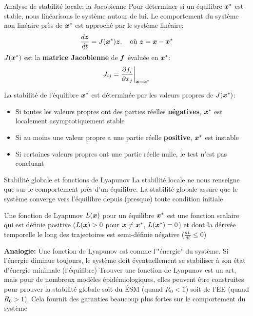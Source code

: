 \documentclass[aspectratio=169]{beamer}\usepackage[]{graphicx}\usepackage[]{xcolor}
\begin{document}
\begin{frame}{Analyse de stabilité locale: la Jacobienne}
    Pour déterminer si un équilibre $\bm{x}^*$ est stable, nous linéarisons le système autour de lui.
    Le comportement du système non linéaire près de $\bm{x}^*$ est approché par le système linéaire:
    $$ \frac{d\bm{z}}{dt} = J(\bm{x}^*) \bm{z}, \quad \text{où } \bm{z} = \bm{x} - \bm{x}^* $$
    $J(\bm{x}^*)$ est la \textbf{matrice Jacobienne} de $\bm{f}$ évaluée en $\bm{x}^*$:
    $$ J_{ij} = \frac{\partial f_i}{\partial x_j} \bigg|_{\bm{x}=\bm{x}^*} $$
    \begin{theorem}
        La stabilité de l'équilibre $\bm{x}^*$ est déterminée par les valeurs propres de $J(\bm{x}^*)$:
        \begin{itemize}
            \item Si toutes les valeurs propres ont des parties réelles \textbf{négatives}, $\bm{x}^*$ est localement asymptotiquement stable
            \item Si au moins une valeur propre a une partie réelle \textbf{positive}, $\bm{x}^*$ est instable
            \item Si certaines valeurs propres ont une partie réelle nulle, le test n'est pas concluant
        \end{itemize}
    \end{theorem}
\end{frame}

\begin{frame}{Stabilité globale et fonctions de Lyapunov}
    La stabilité locale ne nous renseigne que sur le comportement près d'un équilibre. La stabilité globale assure que le système converge vers l'équilibre depuis (presque) toute condition initiale
    \begin{definition}
        Une fonction de Lyapunov $L(\bm{x})$ pour un équilibre $\bm{x}^*$ est une fonction scalaire qui est définie positive ($L(\bm{x})>0$ pour $\bm{x}\neq\bm{x}^*$, $L(\bm{x}^*)=0$) et dont la dérivée temporelle le long des trajectoires est semi-définie négative ($\frac{dL}{dt} \le 0$)
    \end{definition}
    \textbf{Analogie:} Une fonction de Lyapunov est comme l'"énergie" du système. Si l'énergie diminue toujours, le système doit éventuellement se stabiliser à son état d'énergie minimale (l'équilibre)
    \vfill
    Trouver une fonction de Lyapunov est un art, mais pour de nombreux modèles épidémiologiques, elles peuvent être construites pour prouver la stabilité globale soit du ÉSM (quand $R_0 < 1$) soit de l'EE (quand $R_0 > 1$). Cela fournit des garanties beaucoup plus fortes sur le comportement du système
\end{frame}
\end{document}
